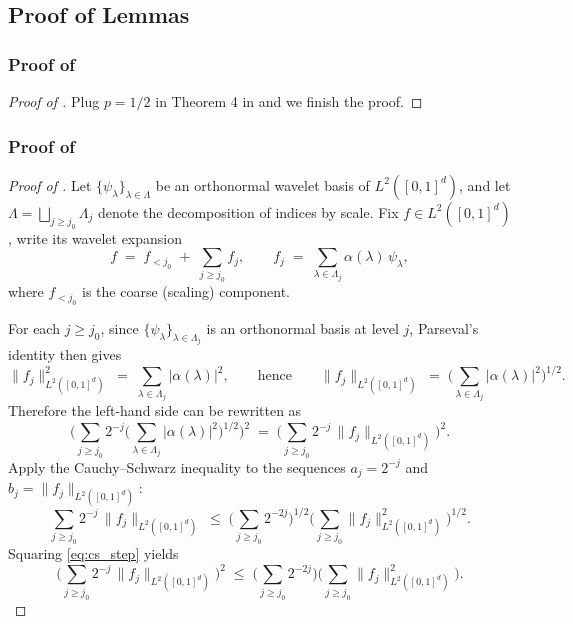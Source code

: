 \documentclass{article}
\theoremstyle{plain}
\theoremstyle{definition}
\theoremstyle{plain}
\begin{document}
\subsection{Proof of Lemmas}
\subsubsection{Proof of }
\begin{proof}[Proof of ]
    Plug $p=1/2$ in Theorem 4 in \parencite{niles2022minimax} and we finish the proof.
\end{proof}
\subsubsection{Proof of }
\begin{proof}[Proof of ]
Let $\{\psi_{\lambda}\}_{\lambda\in\Lambda}$ be an orthonormal wavelet basis of $L^2([0,1]^{d})$, and let $\Lambda=\bigsqcup_{j\ge j_0}\Lambda_j$ denote the decomposition of indices by scale. Fix $f\in L^2([0,1]^{d})$, write its wavelet expansion
\[
f \;=\; f_{<j_0} \;+\; \sum_{j\ge j_0} f_j,
\qquad
f_j \;=\; \sum_{\lambda\in\Lambda_j}\alpha(\lambda)\,\psi_{\lambda},
\]
where $f_{<j_0}$ is the coarse (scaling) component. 


For each $j\ge j_0$, since $\{\psi_{\lambda}\}_{\lambda\in\Lambda_j}$ is an orthonormal basis at level $j$, Parseval's identity then gives
\begin{equation}\label{eq:parseval_Wj}
\|f_j\|_{L^2([0,1]^{d})}^2
\;=\;
\sum_{\lambda\in\Lambda_j}|\alpha(\lambda)|^2,
\qquad\text{hence}\qquad
\|f_j\|_{L^2([0,1]^{d})}
\;=\;
\Big(\sum_{\lambda\in\Lambda_j}|\alpha(\lambda)|^2\Big)^{1/2}.
\end{equation}
Therefore the left-hand side can be rewritten as
\[
\Bigg(\sum_{j\ge j_0} 2^{-j}\Big(\sum_{\lambda\in\Lambda_j}|\alpha(\lambda)|^2\Big)^{1/2}\Bigg)^2
\;=\;
\Bigg(\sum_{j\ge j_0}2^{-j}\,\|f_j\|_{L^2([0,1]^{d})}\Bigg)^2.
\]
Apply the Cauchy--Schwarz inequality to the sequences
$a_j = 2^{-j}$ and $b_j=\|f_j\|_{L^2([0,1]^{d})}$:
\begin{equation}\label{eq:cs_step}
\sum_{j\ge j_0}2^{-j}\,\|f_j\|_{L^2([0,1]^{d})}
\;\le\;
\Bigg(\sum_{j\ge j_0}2^{-2j}\Bigg)^{1/2}
\Bigg(\sum_{j\ge j_0}\|f_j\|_{L^2([0,1]^{d})}^2\Bigg)^{1/2}.
\end{equation}
Squaring \eqref{eq:cs_step} yields
\begin{equation}\label{eq:cs_step_sq}
\Bigg(\sum_{j\ge j_0}2^{-j}\,\|f_j\|_{L^2([0,1]^{d})}\Bigg)^2
\;\le\;
\Bigg(\sum_{j\ge j_0}2^{-2j}\Bigg)
\Bigg(\sum_{j\ge j_0}\|f_j\|_{L^2([0,1]^{d})}^2\Bigg).
\end{equation}


\end{proof}
\end{document}
